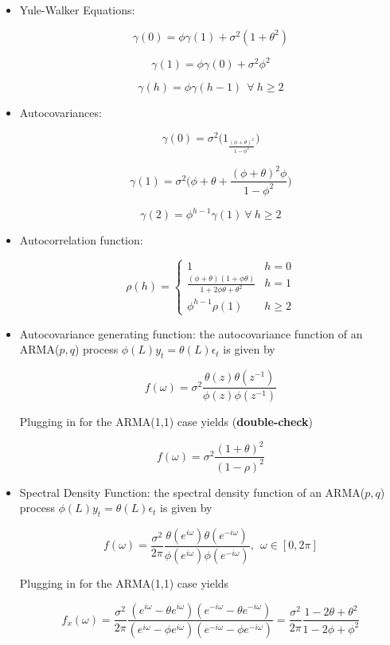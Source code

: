 \documentclass{article}
\begin{document}
\begin{itemize}

\item Yule-Walker Equations:

\[
\gamma(0) = \phi \gamma(1) + \sigma^2(1 + \theta^2)
\]

\[
\gamma(1) = \phi \gamma(0) + \sigma^2 \phi^2
\]

\[
\gamma(h) = \phi \gamma(h-1) \ \ \forall \ h \geq 2
\]

\item Autocovariances:

\[
\gamma(0) = \sigma^2 \bigg( 1 _ \frac{(\phi + \theta)^2}{1 - \phi^2} \bigg) 
\]

\[
\gamma(1) = \sigma^2 \bigg( \phi + \theta + \frac{(\phi + \theta)^2 \phi}{1 - \phi^2} \bigg)
\]

\[
\gamma(2) = \phi^{h-1} \gamma(1) \ \forall \ h \geq 2
\]

\item Autocorrelation function:

\[
\rho(h) = \begin{cases} 
      1 & h = 0 \\
      \frac{(\phi + \theta)(1 + \phi \theta)}{1 + 2 \phi\theta + \theta^2} & h = 1 \\
      \phi^{h-1} \rho(1) & h \geq 2
   \end{cases}
\]

\item Autocovariance generating function: the autocovariance function of an ARMA(\(p, q\)) process \(\phi(L)y_t = \theta(L) \epsilon_t\) is given by

\[
f(\omega) = \sigma^2 \frac{\theta(z) \theta(z^{- 1}) }{\phi(z) \phi(z^{-1})}
\]

Plugging in for the ARMA(1,1) case yields (\textbf{double-check})

\[
f(\omega) = \sigma^2 \frac{ (1+ \theta)^2 }{(1 - \rho)^2}
\]

\item Spectral Density Function: the spectral density function of an ARMA(\(p, q\)) process \(\phi(L)y_t = \theta(L) \epsilon_t\) is given by

\[
f(\omega) = \frac{\sigma^2}{2\pi} \frac{\theta(e^{i \omega}) \theta(e^{- i \omega}) }{\phi(e^{i \omega}) \phi(e^{- i \omega})}, \ \ \omega \in [0, 2\pi]
\]

Plugging in for the ARMA(1,1) case yields

\[
f_x(\omega)= \frac{\sigma^2}{2\pi} \frac{(e^{i \omega} - \theta e^{i \omega} )(e^{-i \omega} - \theta e^{-i \omega})}{(e^{i \omega} - \phi e^{i \omega} )(e^{- i \omega} - \phi e^{- i \omega} )} = \frac{\sigma^2}{2\pi} \frac{1 - 2\theta + \theta^2}{1 -2\phi + \phi^2}
\]


\end{itemize}
\end{document}

